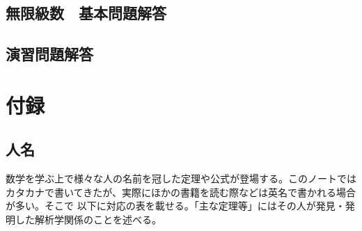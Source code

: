 \documentclass[a4j,dvipdfmx]{jsarticle}
\begin{document}
        \clearpage
        \subsection{無限級数　基本問題解答}
        \clearpage
        \subsection{演習問題解答}
        \clearpage
        \color{black}
        \section{付録}
            \subsection{人名}
                数学を学ぶ上で様々な人の名前を冠した定理や公式が登場する。このノートではカタカナで書いてきたが、実際にほかの書籍を読む際などは英名で書かれる場合が多い。そこで
                以下に対応の表を載せる。「主な定理等」にはその人が発見・発明した解析学関係のことを述べる。
                
\end{document}

